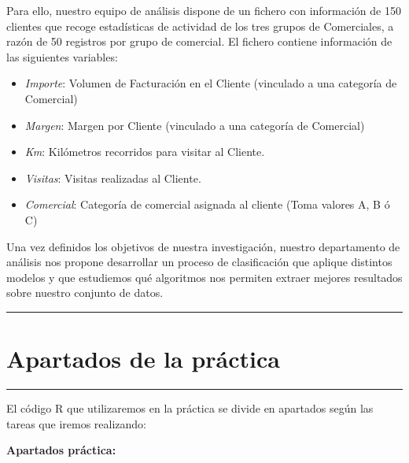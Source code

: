 \documentclass[]{article}
\begin{document}
Para ello, nuestro equipo de análisis dispone de un fichero con
información de 150 clientes que recoge estadísticas de actividad de los
tres grupos de Comerciales, a razón de 50 registros por grupo de
comercial. El fichero contiene información de las siguientes variables:

\begin{itemize}
\item
  \emph{Importe}: Volumen de Facturación en el Cliente (vinculado a una
  categoría de Comercial)
\item
  \emph{Margen}: Margen por Cliente (vinculado a una categoría de
  Comercial)
\item
  \emph{Km}: Kilómetros recorridos para visitar al Cliente.
\item
  \emph{Visitas}: Visitas realizadas al Cliente.
\item
  \emph{Comercial}: Categoría de comercial asignada al cliente (Toma
  valores A, B ó C)
\end{itemize}

Una vez definidos los objetivos de nuestra investigación, nuestro
departamento de análisis nos propone desarrollar un proceso de
clasificación que aplique distintos modelos y que estudiemos qué
algoritmos nos permiten extraer mejores resultados sobre nuestro
conjunto de datos.

\begin{center}\rule{0.5\linewidth}{\linethickness}\end{center}

\section{Apartados de la práctica}\label{apartados-de-la-practica}

\begin{center}\rule{0.5\linewidth}{\linethickness}\end{center}

El código R que utilizaremos en la práctica se divide en apartados según
las tareas que iremos realizando:

\textbf{Apartados práctica:}
\end{document}
